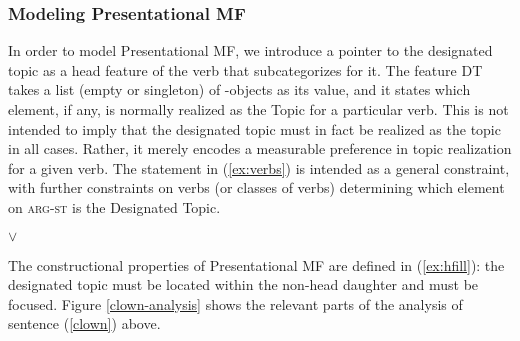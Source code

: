 \begin{exe}
\begin{xlist}[iv.]
\begin{exe}
\begin{xlist}[iv.]
\begin{exe}
\begin{xlist}[iv.]



\subsubsection{Modeling Presentational MF}
\label{sec-presentationl-mf}

In order to model Presentational MF, we introduce a pointer to the designated topic as a head feature of the verb that subcategorizes for it. The feature \textsc{DT} takes a list (empty or singleton) of -objects as its value, and it states which element, if any, is normally realized as the Topic for a particular verb. This is not intended to imply that the designated topic must in fact be realized as the topic in all cases. Rather, it merely encodes a measurable preference in topic realization for a given verb. The statement in (\ref{ex:verbs}) is intended as a general constraint, with further constraints on verbs (or classes of verbs) determining which element on \textsc{arg-st} is the Designated Topic.


\ea
\label{ex:verbs}
 \impl {} $\vee$ 
\z
                                      
The constructional properties of Presentational MF are defined in (\ref{ex:hfill}): the designated topic must be located within the non-head daughter and must be focused. %
 Figure \ref{clown-analysis} shows the relevant parts of the analysis of sentence (\ref{clown}) above.


\ea\label{ex:hfill}
 \impl
{}
\z


\end{xlist}
\end{exe}
\end{xlist}
\end{exe}
\end{xlist}
\end{exe}
